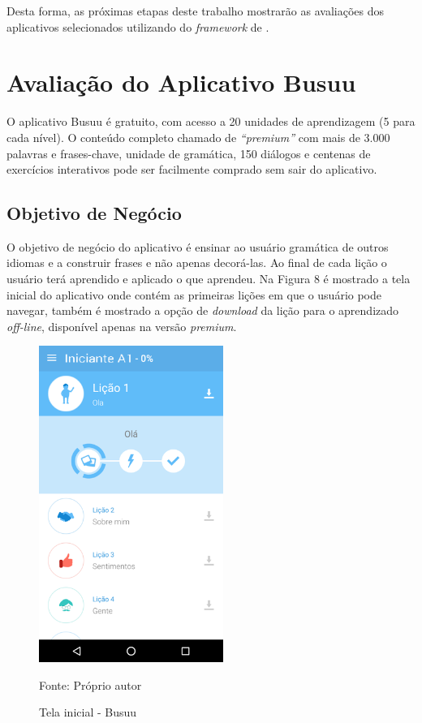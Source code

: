 \documentclass[
	12pt,				%
	openany,			%
	oneside,			%
	a4paper,			%
	english,			%
	french,				%
	spanish,			%
	brazil				%
	]{abntex2}
\begin{document}
	Desta forma, as próximas etapas deste trabalho mostrarão as avaliações dos aplicativos selecionados utilizando do \textit{framework} de .

\section{Avaliação do Aplicativo Busuu}
	O aplicativo Busuu é gratuito, com acesso a 20 unidades de aprendizagem (5 para cada nível). O conteúdo completo chamado de \textit{“premium”} com mais de 3.000 palavras e frases-chave, unidade de gramática, 150 diálogos e centenas de exercícios interativos pode ser facilmente comprado sem sair do aplicativo.

\subsection{Objetivo de Negócio}
	O objetivo de negócio do aplicativo é ensinar ao usuário gramática de outros idiomas e a construir frases e não apenas decorá-las. Ao final de cada lição o usuário terá aprendido e aplicado o que aprendeu. Na Figura 8 é mostrado a tela inicial do aplicativo onde contém as primeiras lições em que o usuário pode navegar, também é mostrado a opção de \textit{download} da lição para o aprendizado \textit{off-line}, disponível apenas na versão \textit{premium}.

\begin{figure}[H]
    \centering
\caption{Tela inicial - Busuu}
\includegraphics[width=6cm]{figuras/inicialbusuu.png}
\par
 Fonte: Próprio autor
\end{figure}
\end{document}
